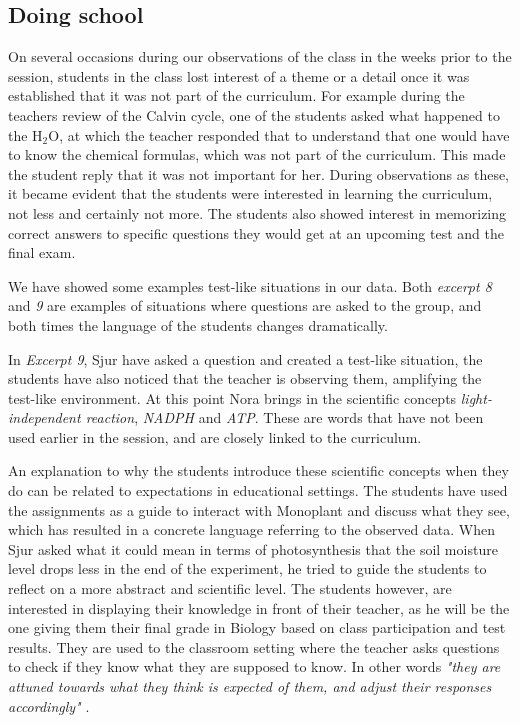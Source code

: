 \subsection{Doing school}
On several occasions during our observations of the class in the weeks prior to the session, students in the class lost interest of a theme or a detail once it was established that it was not part of the curriculum. For example during the teachers review of the Calvin cycle, one of the students asked what happened to the $\text{H}_2\text{O}$, at which the teacher responded that to understand that one would have to know the chemical formulas, which was not part of the curriculum. This made the student reply that it was not important for her. During observations as these, it became evident that the students were interested in learning the curriculum, not less and certainly not more. The students also showed interest in memorizing correct answers to specific questions they would get at an upcoming test and the final exam. 

We have showed some examples test-like situations in our data. Both \emph{excerpt 8} and \emph{9} are examples of situations where questions are asked to the group, and both times the language of the students changes dramatically. 

In \emph{Excerpt 9}, Sjur have asked a question and created a test-like situation, the students have also noticed that the teacher is observing them, amplifying the test-like environment. At this point Nora brings in the scientific concepts \emph{light-independent reaction}, \emph{NADPH} and \emph{ATP}. These are words that have not been used earlier in the session, and are closely linked to the curriculum. 

An explanation to why the students introduce these scientific concepts when they do can be related to expectations in educational settings. The students have used the assignments as a guide to interact with Monoplant and discuss what they see, which has resulted in a concrete language referring to the observed data. When Sjur asked what it could mean in terms of photosynthesis that the soil moisture level drops less in the end of the experiment, he tried to guide the students to reflect on a more abstract and scientific level. The students however, are interested in displaying their knowledge in front of their teacher, as he will be the one giving them their final grade in Biology based on class participation and test results. They are used to the classroom setting where the teacher asks questions to check if they know what they are supposed to know. In other words \emph{"they are attuned towards what they think is expected of them, and adjust their responses accordingly"} \citep{furberg2009socio}. 

